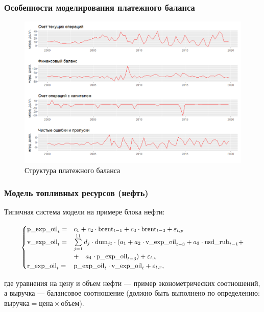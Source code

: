 \documentclass[9pt]{beamer}
\newcommand{\lsum}{\sum\limits}
\begin{document}
\begin{frame}
		\frametitle{Особенности моделирования платежного баланса}
			\begin{figure}[htp!]
			\centering
			\includegraphics[width=\textwidth]{struct.png}
			\captionsetup{justification=centering}
			\caption{Структура платежного баланса}
		\end{figure}
\end{frame}


\begin{frame}
	\frametitle{Модель топливных ресурсов (нефть)}
Типичная система модели на примере блока нефти:

\begin{align*} 
\small
	\begin{cases}
	\text{p\_exp\_oil}_t =&c_1 + c_2 \cdot \text{brent}_{t-1} + c_3 \cdot \text{brent}_{t-3} + \varepsilon_{t,p}\\
	\text{v\_exp\_oil}_t =&\lsum_{j = 1}^{11} d_j \cdot \text{dum}_{jt} \cdot(a_1 + a_2 \cdot \text{v\_exp\_oil}_{t-3} + a_3 \cdot \text{usd\_rub}_{t-1} + \\ 
	&+ \quad a_4 \cdot \text{p\_exp\_oil}_{t-3}) + \varepsilon_{t,v}\\
	\text{r\_exp\_oil}_t =&\text{p\_exp\_oil}_t \cdot \text{v\_exp\_oil}_t + \varepsilon_{t,r},
	\end{cases}
\end{align*}

где уравнения на цену и объем нефти — пример эконометрических соотношений, а выручка — балансовое соотношение (должно быть выполнено по определению: $\text{выручка} = \text{цена} \times \text{объем}$).
\end{frame}
\end{document}
